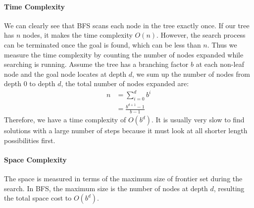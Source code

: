 \documentclass[../main.tex]{subfiles}
\begin{document}
\paragraph{Time Complexity} We can clearly see that BFS scans each node in the tree exactly once. If our tree has $n$ nodes, it makes the time complexity $O(n)$. However, the search process can be terminated once the goal is found, which can be less than $n$. Thus we measure the time complexity by counting the number of nodes expanded while searching is running.  Assume the tree has a branching factor $b$ at each non-leaf node and the goal node locates at depth $d$, we sum up the number of nodes from depth 0 to depth $d$, the total number of nodes expanded are:
\begin{align}
    n &= \sum_{i=0}^{d} b^{i} \\
    &= \frac{b^{d+1} -1}{b-1}
\end{align}
Therefore, we have a time complexity of $O(b^d)$. It is usually very slow to find solutions with a large number of steps because it must look at all shorter length possibilities first.%
\paragraph{Space Complexity}
The space is measured in terms of the maximum size of frontier set during the search. In BFS, the maximum size is the number of nodes at depth $d$, resulting the total space cost to  $O(b^d)$.


\end{document}
